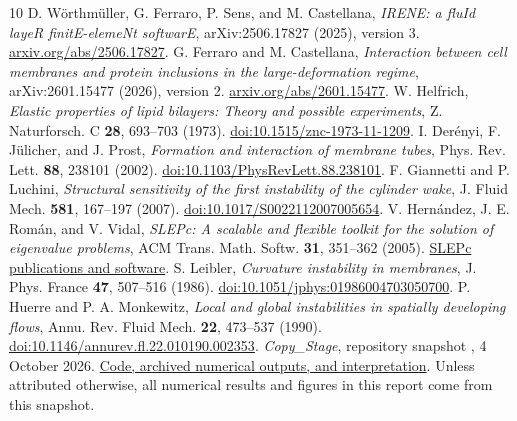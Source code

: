 \begin{thebibliography}{10}
 D. W\"orthm\"uller, G. Ferraro, P. Sens, and M. Castellana, \emph{IRENE: a fluId layeR finitE-elemeNt softwarE}, arXiv:2506.17827 (2025), version 3. \href{https://arxiv.org/abs/2506.17827}{arxiv.org/abs/2506.17827}.
 G. Ferraro and M. Castellana, \emph{Interaction between cell membranes and protein inclusions in the large-deformation regime}, arXiv:2601.15477 (2026), version 2. \href{https://arxiv.org/abs/2601.15477}{arxiv.org/abs/2601.15477}.
 W. Helfrich, \emph{Elastic properties of lipid bilayers: Theory and possible experiments}, Z. Naturforsch. C \textbf{28}, 693--703 (1973). \href{https://doi.org/10.1515/znc-1973-11-1209}{doi:10.1515/znc-1973-11-1209}.
 I. Der\'enyi, F. J\"ulicher, and J. Prost, \emph{Formation and interaction of membrane tubes}, Phys. Rev. Lett. \textbf{88}, 238101 (2002). \href{https://doi.org/10.1103/PhysRevLett.88.238101}{doi:10.1103/PhysRevLett.88.238101}.
 F. Giannetti and P. Luchini, \emph{Structural sensitivity of the first instability of the cylinder wake}, J. Fluid Mech. \textbf{581}, 167--197 (2007). \href{https://doi.org/10.1017/S0022112007005654}{doi:10.1017/S0022112007005654}.
 V. Hern\'andez, J. E. Rom\'an, and V. Vidal, \emph{SLEPc: A scalable and flexible toolkit for the solution of eigenvalue problems}, ACM Trans. Math. Softw. \textbf{31}, 351--362 (2005). \href{https://slepc.upv.es/release/material/index.html}{SLEPc publications and software}.
 S. Leibler, \emph{Curvature instability in membranes}, J. Phys. France \textbf{47}, 507--516 (1986). \href{https://doi.org/10.1051/jphys:01986004703050700}{doi:10.1051/jphys:01986004703050700}.
 P. Huerre and P. A. Monkewitz, \emph{Local and global instabilities in spatially developing flows}, Annu. Rev. Fluid Mech. \textbf{22}, 473--537 (1990). \href{https://doi.org/10.1146/annurev.fl.22.010190.002353}{doi:10.1146/annurev.fl.22.010190.002353}.
 \emph{Copy\_Stage}, repository snapshot , 4 October 2026. \href{https://github.com/heiriru/Copy_Stage/tree/45d54f29909d4026ece901c28287b23104190b1d/Ruben/membrane_stability}{Code, archived numerical outputs, and interpretation}. Unless attributed otherwise, all numerical results and figures in this report come from this snapshot.
\end{thebibliography}
